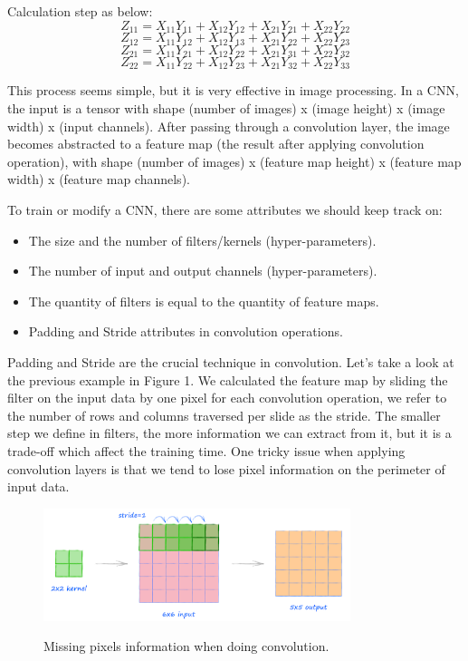 	Calculation step as below:
	\[Z_{11} = X_{11}Y_{11} + X_{12}Y_{12} + X_{21}Y_{21} + X_{22}Y_{22}\]
	\[Z_{12} = X_{11}Y_{12} + X_{12}Y_{13} + X_{21}Y_{22} + X_{22}Y_{23}\]
	\[Z_{21} = X_{11}Y_{21} + X_{12}Y_{22} + X_{21}Y_{31} + X_{22}Y_{32}\]
	\[Z_{22} = X_{11}Y_{22} + X_{12}Y_{23} + X_{21}Y_{32} + X_{22}Y_{33}\]
	
	This process seems simple, but it is very effective in image processing. In a CNN, the input is a tensor with shape (number of images) x (image height) x (image width) x (input channels). After passing through a convolution layer, the image becomes abstracted to a feature map (the result after applying convolution operation), with shape (number of images) x (feature map height) x (feature map width) x (feature map channels).
	
	To train or modify a CNN, there are some attributes we should keep track on:
	\begin{itemize}
		\item The size and the number of filters/kernels (hyper-parameters).
		\item The number of input and output channels (hyper-parameters).
		\item The quantity of filters is equal to the quantity of feature maps.
		\item Padding and Stride attributes in convolution operations.
	\end{itemize}

	Padding and Stride are the crucial technique in convolution. Let’s take a look at the previous example in Figure 1. We calculated the feature map by sliding the filter on the input data by one pixel for each convolution operation, we refer to the number of rows and columns traversed per slide as the stride. The smaller step we define in filters, the more information we can extract from it, but it is a trade-off which affect the training time. One tricky issue when applying convolution layers is that we tend to lose pixel information on the perimeter of input data.
	
	\begin{figure}[H]
		\centering
		{\includegraphics[width=0.8\textwidth]{./hinhanh/chap3/padding.png}}
		\caption{Missing pixels information when doing convolution.}
	\end{figure}

